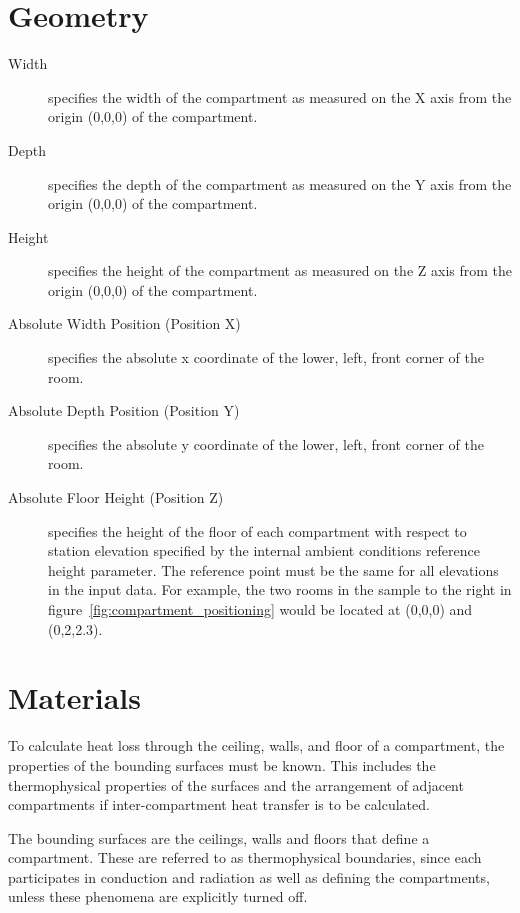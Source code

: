 \section{Geometry}

\label{Compartment_Inputs}
\begin{description}
\item[Width] specifies the width of the compartment as measured on the X axis from the origin (0,0,0) of the compartment.

\item[Depth] specifies the depth of the compartment as measured on the Y axis from the origin (0,0,0) of the compartment.

\item[Height] specifies the height of the compartment as measured on the Z axis from the origin (0,0,0) of the compartment.

\item[Absolute Width Position (Position X)] specifies the absolute x coordinate of the lower, left, front corner of the room.

\item[Absolute Depth Position (Position Y)] specifies the absolute y coordinate of the lower, left, front corner of the room.

\item[Absolute Floor Height (Position Z)] specifies the height of the floor of each compartment with respect to station elevation specified by the internal ambient conditions reference height parameter.  The reference point must be the same for all elevations in the input data.  For example, the two rooms in the sample to the right in figure~\ref{fig:compartment_positioning} would be located at (0,0,0) and (0,2,2.3).
\end{description}

\section{Materials}

To calculate heat loss through the ceiling, walls, and floor of a compartment, the properties of the bounding surfaces must be known. This includes the thermophysical properties of the surfaces and the arrangement of adjacent compartments if inter-compartment heat transfer is to be calculated.

The bounding surfaces are the ceilings, walls and floors that define a compartment. These are referred to as thermophysical boundaries, since each participates in conduction and radiation as well as defining the compartments, unless these phenomena are explicitly turned off.

